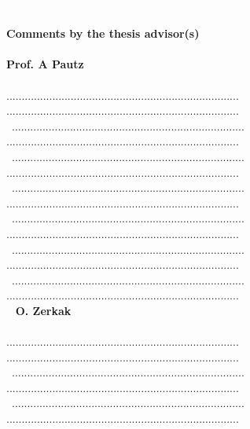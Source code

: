 \documentclass[11pt,titlepage]{article}
\begin{document}
\printbibliography[heading=none]

\newpage
\textcolor{white}.\\\\
\noindent \textbf{Comments by the thesis advisor(s)}\\\\
\noindent\textbf{Prof. A Pautz}\\\\
............................................................................
............................................................................\\\
............................................................................
............................................................................\\\
............................................................................
............................................................................\\\
............................................................................
............................................................................\\\
............................................................................
............................................................................\\\
............................................................................
............................................................................\\\
............................................................................
............................................................................\\\
%
\noindent\textbf{O. Zerkak}\\\\
............................................................................
............................................................................\\\
............................................................................
............................................................................\\\
............................................................................
............................................................................\\\
\end{document}
